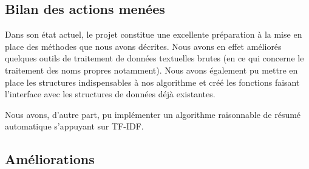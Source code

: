 \documentclass[a4paper, 12pt]{article}
\begin{document}
\subsection{Bilan des actions menées}

Dans son état actuel, le projet constitue une excellente préparation à la mise en place des méthodes que nous avons décrites. Nous avons en effet améliorés quelques outils de traitement de données textuelles brutes (en ce qui concerne le traitement des noms propres notamment). Nous avons également pu mettre en place les structures indispensables à nos algorithme et créé les fonctions faisant l'interface avec les structures de données déjà existantes.

Nous avons, d'autre part, pu implémenter un algorithme raisonnable de résumé automatique s'appuyant sur TF-IDF. %

\vspace{1\baselineskip}

\subsection{Améliorations}





\end{document}
